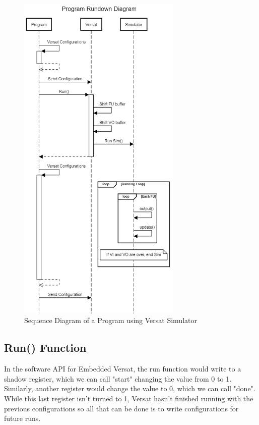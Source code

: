 \newpage
\begin{figure}[!htbp]
    \centering
    \includegraphics[width=0.7\textwidth]{Figures/versatsim.png}
    \caption{Sequence Diagram of a Program using Versat Simulator}
    \label{figure:VersatSimulatorSequenceDiagram}
\end{figure} 



\subsection{Run() Function}

In the software API for Embedded Versat, the run function would write to a shadow register,
which we can call "start" changing the value from 0 to 1. 
Similarly, another register would
change the value to 0, which we can call "done". While this last register isn't turned to 1, 
Versat hasn't finished running with the 
previous configurations so all that can be done is to write
configurations for future runs.

